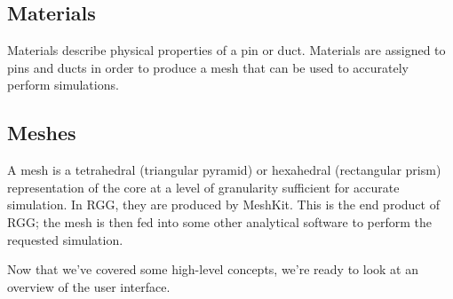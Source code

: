 \subsection{Materials}
Materials describe physical properties of a pin or duct.  Materials are assigned to pins and ducts in order to produce a mesh that can be used to accurately perform simulations.

\subsection{Meshes}
A mesh is a tetrahedral (triangular pyramid) or hexahedral (rectangular prism) representation of the core at a level of granularity sufficient for accurate simulation.  In RGG, they are produced by MeshKit.  This is the end product of RGG; the mesh is then fed into some other analytical software to perform the requested simulation.

Now that we've covered some high-level concepts, we're ready to look at an overview of the user interface.